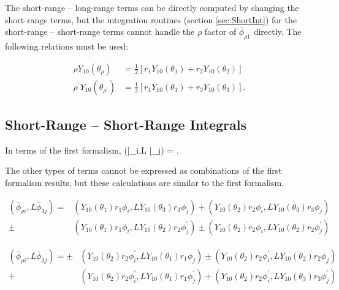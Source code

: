 \documentclass[Dissertation.tex]{subfiles}
\begin{document}
The short-range -- long-range terms can be directly computed by changing the short-range terms, but the integration routines (section \ref{sec:ShortInt}) for the short-range -- short-range terms cannot handle the $\rho$ factor of $\bar{\phi}_{\rho 1}$ directly. The following relations must be used:

\begin{subequations}
\begin{align}
\rho Y_{10}(\theta_\rho) &= \frac{1}{2}\left[ r_1 Y_{10}(\theta_1) + r_2 Y_{10}(\theta_2) \right] \\
\rho^\prime Y_{10}(\theta_{\rho^\prime}) &= \frac{1}{2}\left[ r_1 Y_{10}(\theta_1) + r_3 Y_{10}(\theta_3) \right].
\end{align}
\end{subequations}



\subsection{Short-Range -- Short-Range Integrals}
\label{sec:PWave2ndShortShort}
In terms of the first formalism,
\beq
\left(\bar{\phi}_{\rho i},L \bar{\phi}_{\rho j}\right) =  .
\eeq

The other types of terms cannot be expressed as combinations of the first formalism results, but these calculations are similar to the first formalism.

\begin{align}
\nonumber \left(\bar{\phi}_{\rho i},L \bar{\phi}_{3j}\right) = &(Y_{10}(\theta_1) r_1 \phi_i, L Y_{10}(\theta_3) r_3 \phi_j) + (Y_{10}(\theta_2) r_2 \phi_i, L Y_{10}(\theta_3) r_3 \phi_j) \\
\pm &(Y_{10}(\theta_1) r_1 \phi_i, L Y_{10}(\theta_2) r_2 \phi_j^\prime) \pm (Y_{10}(\theta_2) r_2 \phi_i, L Y_{10}(\theta_2) r_2 \phi_j^\prime)
\end{align}

\begin{align}
\nonumber \left(\bar{\phi}_{\rho i},L \bar{\phi}_{3j}\right) = \pm &(Y_{10}(\theta_2) r_2 \phi_i^\prime, L Y_{10}(\theta_1) r_1 \phi_j) \pm (Y_{10}(\theta_2) r_2 \phi_i^\prime, L Y_{10}(\theta_2) r_2 \phi_j) \\
+ &(Y_{10}(\theta_2) r_2 \phi_i^\prime, L Y_{10}(\theta_1) r_1 \phi_j^\prime) + (Y_{10}(\theta_2) r_2 \phi_i^\prime, L Y_{10}(\theta_3) r_3 \phi_j^\prime)
\end{align}
\end{document}
